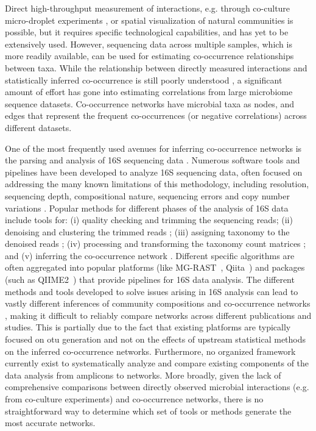  Direct high-throughput measurement of interactions, e.g. through co-culture micro-droplet experiments \cite{Hsu2019,Jian2020}, or spatial visualization of natural communities \cite{Wilbert2020} is possible, but it requires specific technological capabilities, and has yet to be extensively used.
 However, sequencing data across multiple samples, which is more readily available, can be used for estimating co-occurrence relationships between taxa.
 While the relationship between directly measured interactions and statistically inferred co-occurrence is still poorly understood \cite{Zuniga2017}, a significant amount of effort has gone into estimating correlations from large microbiome sequence datasets.
 Co-occurrence networks have microbial taxa as nodes, and edges that represent the frequent co-occurrences (or negative correlations) across different datasets.

One of the most frequently used avenues for inferring co-occurrence networks is the parsing and analysis of 16S sequencing data \cite{Rottjers2018,Friedman2012}.
Numerous software tools and pipelines have been developed to analyze 16S sequencing data, often focused on addressing the many known limitations of this methodology, including resolution, sequencing depth, compositional nature, sequencing errors and copy number variations \cite{Bharti2019,Pollock2018}.
Popular methods for different phases of the analysis of 16S data include tools for: (i) quality checking and trimming the sequencing reads; (ii) denoising and clustering the trimmed reads \cite{Caporaso2010,Callahan2016}; (iii) assigning taxonomy to the denoised reads \cite{DeSantis2006,Quast2012}; (iv) processing and transforming the taxonomy count matrices \cite{Weiss2015}; and (v) inferring the co-occurrence network \cite{Cougoul2019,Kurtz2015}.
Different specific algorithms are often aggregated into popular platforms (like MG-RAST~\cite{Keegan2016}, Qiita~\cite{qiita}) and packages (such as QIIME2~\cite{bolyenReproducibleInteractiveScalable2019}) that provide pipelines for 16S data analysis.
The different methods and tools developed to solve issues arising in 16S analysis can lead to vastly different inferences of community compositions and co-occurrence networks \cite{Golob2017,Weiss2016}, making it difficult to reliably compare networks across different publications and studies.
 This is partially due to the fact that existing platforms are typically focused on \ac{otu} generation and not on the effects of upstream statistical methods on the inferred co-occurrence networks.
 Furthermore, no organized framework currently exist to systematically analyze and compare existing components of the data analysis from amplicons to networks.
  More broadly, given the lack of comprehensive comparisons between directly observed microbial interactions (e.g. from co-culture experiments) and co-occurrence networks, there is no straightforward way to determine which set of tools or methods generate the most accurate networks.

